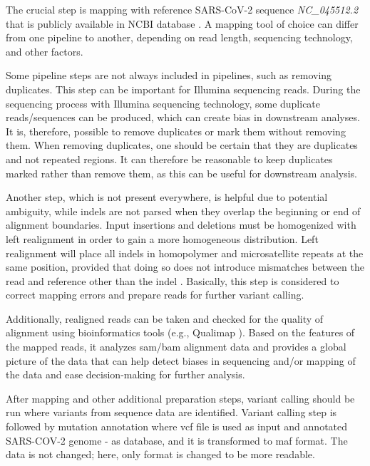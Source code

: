         The crucial step is mapping with reference SARS-CoV-2 sequence \emph{NC\_045512.2} that is publicly available in NCBI database \cite{genome2020}. A mapping tool of choice can differ from one pipeline to another, depending on read length, sequencing technology, and other factors. 
        
        Some pipeline steps are not always included in pipelines, such as removing duplicates. This step can be important for Illumina sequencing reads. During the sequencing process with Illumina sequencing technology, some duplicate reads/sequences can be produced, which can create bias in downstream analyses. It is, therefore, possible to remove duplicates or mark them without removing them. When removing duplicates, one should be certain that they are duplicates and not repeated regions. It can therefore be reasonable to keep duplicates marked rather than remove them, as this can be useful for downstream analysis.
        
        Another step, which is not present everywhere, is helpful due to potential ambiguity, while indels are not parsed when they overlap the beginning or end of alignment boundaries. Input insertions and deletions must be homogenized with left realignment in order to gain a more homogeneous distribution. Left realignment will place all indels in homopolymer and microsatellite repeats at the same position, provided that doing so does not introduce mismatches between the read and reference other than the indel \cite{garrison2012}. Basically, this step is considered to correct mapping errors and prepare reads for further variant calling.
        
        Additionally, realigned reads can be taken and checked for the quality of alignment using bioinformatics tools (e.g., Qualimap \cite{qualimap,qualimap2}). Based on the features of the mapped reads, it analyzes \acrshort{sam}/\acrshort{bam} alignment data and provides a global picture of the data that can help detect biases in sequencing and/or mapping of the data and ease decision-making for further analysis.
        
        After mapping and other additional preparation steps, variant calling should be run where variants from sequence data are identified. Variant calling step is followed by mutation annotation where \acrshort{vcf} file is used as input and annotated SARS-COV-2 genome - as database, and it is transformed to \acrshort{maf} format. The data is not changed; here, only format is changed to be more readable.

